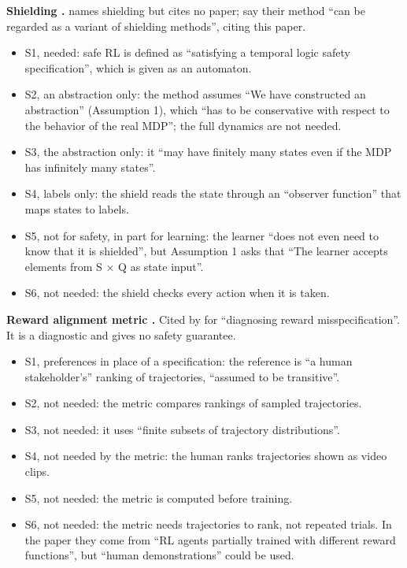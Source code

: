 \documentclass{article}
\providecommand{\tightlist}{\setlength{\itemsep}{0pt}\setlength{\parskip}{0pt}}
\begin{document}
\textbf{Shielding \citep{alshiekh2018}.} \citet{mclean2026} names shielding but cites no paper; \citet{wachi2023} say their method ``can be regarded as a variant of shielding methods'', citing this paper.

\begin{itemize}
\tightlist
\item
  S1, needed: safe RL is defined as ``satisfying a temporal logic safety specification'', which is given as an automaton.
\item
  S2, an abstraction only: the method assumes ``We have constructed an abstraction'' (Assumption 1), which ``has to be conservative with respect to the behavior of the real MDP''; the full dynamics are not needed.
\item
  S3, the abstraction only: it ``may have finitely many states even if the MDP has infinitely many states''.
\item
  S4, labels only: the shield reads the state through an ``observer function'' that maps states to labels.
\item
  S5, not for safety, in part for learning: the learner ``does not even need to know that it is shielded'', but Assumption 1 asks that ``The learner accepts elements from S × Q as state input''.
\item
  S6, not needed: the shield checks every action when it is taken.
\end{itemize}

\textbf{Reward alignment metric \citep{muslimani2025}.} Cited by \citet{mclean2026} for ``diagnosing reward misspecification''. It is a diagnostic and gives no safety guarantee.

\begin{itemize}
\tightlist
\item
  S1, preferences in place of a specification: the reference is ``a human stakeholder's'' ranking of trajectories, ``assumed to be transitive''.
\item
  S2, not needed: the metric compares rankings of sampled trajectories.
\item
  S3, not needed: it uses ``finite subsets of trajectory distributions''.
\item
  S4, not needed by the metric: the human ranks trajectories shown as video clips.
\item
  S5, not needed: the metric is computed before training.
\item
  S6, not needed: the metric needs trajectories to rank, not repeated trials. In the paper they come from ``RL agents partially trained with different reward functions'', but ``human demonstrations'' could be used.
\end{itemize}
\end{document}
